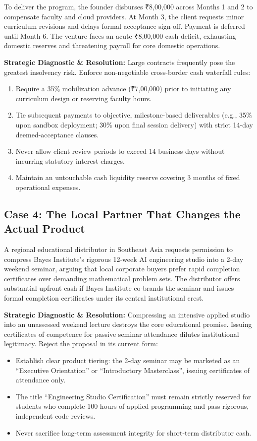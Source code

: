 To deliver the program, the founder disburses ₹8,00,000 across Months 1 and 2 to compensate faculty and cloud providers. At Month 3, the client requests minor curriculum revisions and delays formal acceptance sign-off. Payment is deferred until Month 6. The venture faces an acute ₹8,00,000 cash deficit, exhausting domestic reserves and threatening payroll for core domestic operations.

\textbf{Strategic Diagnostic \& Resolution:} Large contracts frequently pose the greatest insolvency risk. Enforce non-negotiable cross-border cash waterfall rules:
\begin{enumerate}
\item Require a 35\% mobilization advance (₹7,00,000) prior to initiating any curriculum design or reserving faculty hours.
\item Tie subsequent payments to objective, milestone-based deliverables (e.g., 35\% upon sandbox deployment; 30\% upon final session delivery) with strict 14-day deemed-acceptance clauses.
\item Never allow client review periods to exceed 14 business days without incurring statutory interest charges.
\item Maintain an untouchable cash liquidity reserve covering 3 months of fixed operational expenses.
\end{enumerate}

\subsection{Case 4: The Local Partner That Changes the Actual Product}
\label{sec:case4_partner_changes_product}

A regional educational distributor in Southeast Asia requests permission to compress Bayes Institute's rigorous 12-week AI engineering studio into a 2-day weekend seminar, arguing that local corporate buyers prefer rapid completion certificates over demanding mathematical problem sets. The distributor offers substantial upfront cash if Bayes Institute co-brands the seminar and issues formal completion certificates under its central institutional crest.

\textbf{Strategic Diagnostic \& Resolution:} Compressing an intensive applied studio into an unassessed weekend lecture destroys the core educational promise. Issuing certificates of competence for passive seminar attendance dilutes institutional legitimacy. Reject the proposal in its current form:
\begin{itemize}
\item Establish clear product tiering: the 2-day seminar may be marketed as an ``Executive Orientation'' or ``Introductory Masterclass'', issuing certificates of attendance only.
\item The title ``Engineering Studio Certification'' must remain strictly reserved for students who complete 100 hours of applied programming and pass rigorous, independent code reviews.
\item Never sacrifice long-term assessment integrity for short-term distributor cash.
\end{itemize}

